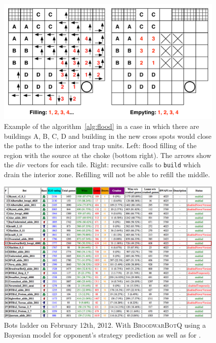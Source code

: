 \begin{figure}[!h]
\begin{center}
\includegraphics[width=13cm]{images/flow_buildings_placer.pdf}
\caption{Example of the algorithm~\ref{alg:flood} in a case in which there are buildings A, B, C, D and building in the new cross spots would close the paths to the interior and trap units. Left: flood filling of the region with the source at the choke (bottom right). The arrows show the $dir$ vectors for each tile. Right: recursive calls to \texttt{build} which drain the interior zone. Refilling will not be able to refill the middle.}
\label{fig:buildingsplacer}
\end{center}
\end{figure}



\begin{figure}
\includegraphics[width=1.0\columnwidth]{images/ladder_2012-02-12.png}
\caption{Bots ladder on February 12th, 2012. With \textsc{BroodwarBotQ} using a Bayesian model for opponent's strategy prediction as well as for .}
\label{fig:ladderbots}
\end{figure}
